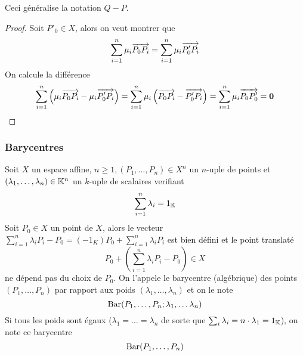 \begin{remark}
	Ceci généralise la notation $Q - P$.
\end{remark}

\begin{proof}
	Soit $P'_0 \in X$, alors on veut montrer que
	\begin{equation*}
		\sum_{i=1}^n \mu_i \overrightarrow{P_0 P_i} = \sum_{i=1}^n \mu_i \overrightarrow{P'_0 P_i}
	\end{equation*}
	On calcule la différence
	\begin{equation*}
		\sum_{i=1}^n \left(\mu_i \overrightarrow{P_0 P_i} - \mu_i \overrightarrow{P'_0 P_i}\right) =
		\sum_{i=1}^n \mu_i\left(\overrightarrow{P_0 P_i} - \overrightarrow{P'_0 P_i}\right) = 
		\sum_{i=1}^n \mu_i \overrightarrow{P_0 P'_0} = \mathbf{0}
	\end{equation*}
\end{proof}

\subsubsection{Barycentres}

\begin{proposition}
	Soit $X$ un espace affine, $n \geq 1, (P_1, \dots, P_n) \in X^n$ un
	$n$-uple de points et $(\lambda_1, \dots, \lambda_n) \in \mathbb{K}^n$ un
	$k$-uple de scalaires verifiant
	\begin{equation*}
		\sum_{i=1}^n \lambda_i = 1_{\mathbb{K}}
	\end{equation*}
	Soit $P_0 \in X$ un point de $X$, alors le vecteur
	$\sum_{i=1}^{n} \lambda_i P_i - P_0 = (-1_K)P_0 + \sum_{i=1}^{n} \lambda_i P_i$
	est bien défini et le point translaté
	\begin{equation*}
		P_0 + \left(\sum_{i=1}^{n}\lambda_i P_i - P_0 \right) \in X
	\end{equation*}
	ne dépend pas du choix de $P_0$. On l'appele le barycentre (algébrique) des
	points $(P_1, \dots, P_n)$ par rapport aux poids $(\lambda_1, \dots, \lambda_n)$ 
	et on le note
	\begin{equation*}
		\operatorname{Bar}(P_1, \dots, P_n; \lambda_1, \dots \lambda_n)	
	\end{equation*}
	Si tous les poids sont égaux ($\lambda_1 = \dots = \lambda_n$ de sorte que
	$\sum_{i} \lambda_i = n \cdot \lambda_1 = 1_{\mathbb{K}}$), on note ce barycentre
	\begin{equation*}
		\operatorname{Bar}(P_1, \dots, P_n)
	\end{equation*}
\end{proposition}

